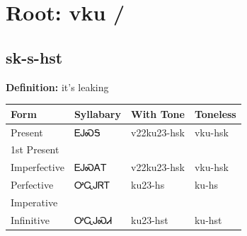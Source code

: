 \documentclass{article}%
\begin{document}
%
\normalsize%
\section*{Root: vku / }%
\subsection*{sk-s-hst}%
\textbf{Definition: }%
it’s leaking%
\\[0.5em]%
\begin{tabular}{|l|l|l|l|}%
\hline%
\textbf{Form}&\textbf{Syllabary}&\textbf{With Tone}&\textbf{Toneless}\\%
\hline%
Present&ᎬᎫᏍᎦ&v22ku23{-}hsk&vku{-}hsk\\%
1st Present&&&\\%
Imperfective&ᎬᎫᏍᎪᎢ&v22ku23{-}hsk&vku{-}hsk\\%
Perfective&ᎤᏩᎫᏒᎢ&ku23{-}hs&ku{-}hs\\%
Imperative&&&\\%
Infinitive&ᎤᏩᎫᏍᏗ&ku23{-}hst&ku{-}hst\\%
\hline%
\end{tabular}%
\\[1em]%
\end{document}
